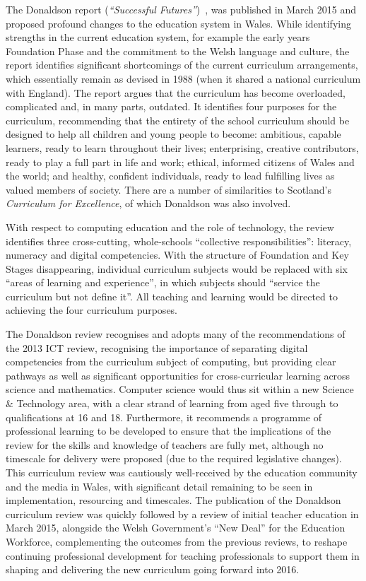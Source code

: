 \documentclass{llncs}
\begin{document}
The Donaldson report (\emph{``Successful
Futures''})~\cite{Donaldson:2015}, was published in March 2015 and
proposed profound changes to the education system in Wales. While
identifying strengths in the current education system, for example the
early years Foundation Phase and the commitment to the Welsh language
and culture, the report identifies significant shortcomings of the
current curriculum arrangements, which essentially remain as devised
in 1988 (when it shared a national curriculum with England). The
report argues that the curriculum has become overloaded, complicated
and, in many parts, outdated. It identifies four purposes for the
curriculum, recommending that the entirety of the school curriculum
should be designed to help all children and young people to become:
ambitious, capable learners, ready to learn throughout their lives;
enterprising, creative contributors, ready to play a full part in life
and work; ethical, informed citizens of Wales and the world; and
healthy, confident individuals, ready to lead fulfilling lives as
valued members of society. There are a number of similarities to
Scotland's {\emph{Curriculum for Excellence}}, of which
Donaldson was also involved.

With respect to computing education and the role of technology, the
review identifies three cross-cutting, whole-schools ``collective
responsibilities'': literacy, numeracy and digital competencies. With
the structure of Foundation and Key Stages disappearing, individual
curriculum subjects would be replaced with six ``areas of learning and
experience'', in which subjects should ``service the curriculum but
not define it''. All teaching and learning would be directed to
achieving the four curriculum purposes.

The Donaldson review recognises and adopts many of the recommendations
of the 2013 ICT review, recognising the importance of separating
digital competencies from the curriculum subject of computing, but
providing clear pathways as well as significant opportunities for
cross-curricular learning across science and mathematics. Computer
science would thus sit within a new Science \& Technology area, with a
clear strand of learning from aged five through to qualifications at
16 and 18. Furthermore, it recommends a programme of professional
learning to be developed to ensure that the implications of the review
for the skills and knowledge of teachers are fully met, although no
timescale for delivery were proposed (due to the required legislative
changes). This curriculum review was cautiously well-received by the
education community and the media in Wales, with significant detail
remaining to be seen in implementation, resourcing and timescales. The
publication of the Donaldson curriculum review was quickly followed by
a review of initial teacher education in March 2015, alongside the
Welsh Government's ``New Deal'' for the Education Workforce,
complementing the outcomes from the previous reviews, to reshape
continuing professional development for teaching professionals to
support them in shaping and delivering the new curriculum going
forward into 2016.
\end{document}
